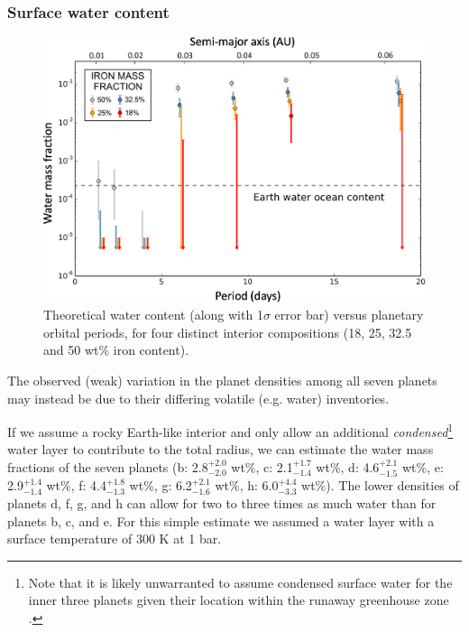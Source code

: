 \documentclass[twocolumn]{aastex63}
\begin{document}
\subsubsection{Surface water content} \label{sec:volatiles}

\begin{figure}
    \centering
    \includegraphics[width=\hsize]{figures/figure_water_period_TTV_trim.png}
    \oscaption{}%
    {Theoretical water content (along with 1$\sigma$ error bar) versus planetary orbital periods, for four distinct interior compositions (18, 25, 32.5 and 50 wt\% iron content).}
    \label{fig:water_vs_period}
\end{figure}

The observed (weak) variation in the planet densities among all seven planets may instead be due to their differing volatile (e.g. water) inventories.

If we assume a rocky Earth-like interior and only allow an additional {\it condensed}\footnote{Note that it is likely unwarranted to assume condensed surface water for the inner three planets given their location within the runaway greenhouse zone \citep{Turbet2020}.} water layer to contribute to the total radius, we can estimate the water mass fractions of the seven planets
(b: 2.8$^{+2.0}_{-2.0}$ wt\%, c: 2.1$^{+1.7}_{-1.4}$ wt\%, d: 4.6$^{+2.1}_{-1.5}$ wt\%, e: 2.9$^{+1.4}_{-1.4}$ wt\%, f: 4.4$^{+1.8}_{-1.3}$ wt\%, g: 6.2$^{+2.1}_{-1.6}$  wt\%, h: 6.0$^{+4.4}_{-3.3}$ wt\%).
The lower densities of planets d, f, g, and h can allow for two to three times as much water than for planets b, c, and e. For this simple estimate we assumed a water layer with a surface temperature of 300 K at 1 bar.
\end{document}
